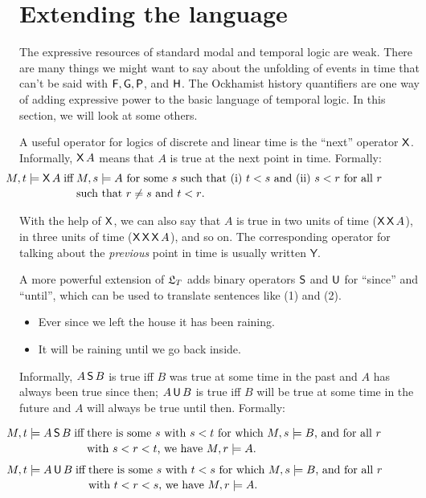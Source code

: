 \section{Extending the language}\label{sec:time2d}

The expressive resources of standard modal and temporal logic are weak. There
are many things we might want to say about the unfolding of events in time that
can't be said with $\operatorname{\mathsf{F}}, \operatorname{\mathsf{G}}, \operatorname{\mathsf{P}}$, and $\operatorname{\mathsf{H}}$. The Ockhamist history quantifiers
are one way of adding expressive power to the basic language of temporal logic.
In this section, we will look at some others.

A useful operator for logics of discrete and linear time is the ``next''
operator $\operatorname{\mathsf{X}}$. Informally, $\operatorname{\mathsf{X}} A$ means that $A$ is true at the next point in
time. Formally:
%
\begin{align*}
\hspace{-17mm}
  M,t \models \tX A \;\text{iff} & \;\text{$M,s \models A$ for some $s$ such that (i) $t<s$ and (ii) $s<r$ for all $r$}\\[-0.5mm]
  & \;\text{such that $r\not=s$ and $t<r$.}
\end{align*}

With the help of $\operatorname{\mathsf{X}}$, we can also say that $A$ is true in two units of time
($\operatorname{\mathsf{X}}\operatorname{\mathsf{X}} A$), in three units of time ($\operatorname{\mathsf{X}}\operatorname{\mathsf{X}}\operatorname{\mathsf{X}} A$), and so on. The
corresponding operator for talking about the \emph{previous} point in time is
usually written $\mathsf{Y}$.

A more powerful extension of $\mathfrak{L}_T$ adds binary operators $\operatorname{\mathsf{S}}$ and $\operatorname{\mathsf{U}}$ for ``since'' and
``until'', which can be used to translate sentences like (1) and (2).
%
\begin{itemize}[leftmargin=10mm]
  \itemsep-1mm
\item[(1)] Ever since we left the house it has been raining.
\item[(2)] It will be raining until we go back inside.
\end{itemize}
%
Informally, $A\operatorname{\mathsf{S}} B$ is true iff $B$ was true at some time in the past and $A$
has always been true since then; $A \operatorname{\mathsf{U}} B$ is true iff $B$ will be true at some
time in the future and $A$ will always be true until then. Formally:

\vspace{-5mm}
\begin{align*}
  \hspace{-17mm}
  M,t \models A \tS B \;\text{iff} &\; \text{there is some $s$ with $s < t$ for which $M,s \models B$, and for all $r$}\\[-0.5mm]
                                    &\;\text{with $s < r < t$, we have $M, r \models A$.}
\end{align*}
\vspace{-12mm}
\begin{align*}
  \hspace{-17mm}
M,t \models A \tU B \;\text{iff} &\; \text{there is some $s$ with $t < s$ for which $M,s \models B$, and for all $r$}\\[-0.5mm]
  &\;\text{with $t < r < s$, we have $M, r \models A$.}
\end{align*}

